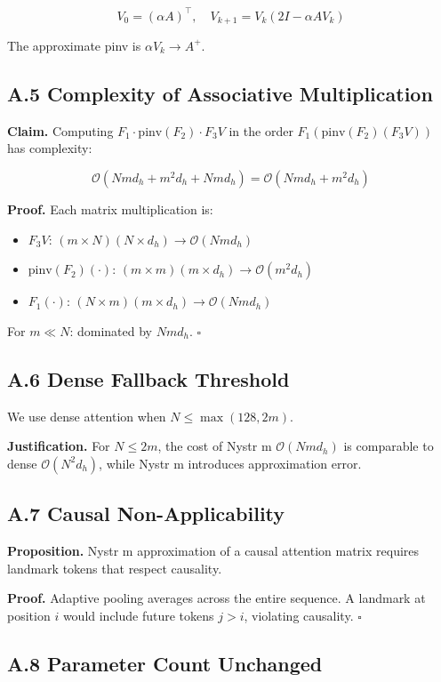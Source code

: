 \[
V_0 = (\alpha A)^\top, \quad V_{k+1} = V_k (2I - \alpha A V_k)
\tag{A.6}
\]

The approximate pinv is $\alpha V_k \to A^+$.

\subsection{A.5 Complexity of Associative Multiplication}

\textbf{Claim.} Computing $F_1 \cdot \text{pinv}(F_2) \cdot F_3 V$ in the order 
$F_1 (\text{pinv}(F_2) (F_3 V))$ has complexity:

\[
\mathcal{O}(N m d_h + m^2 d_h + N m d_h) = \mathcal{O}(N m d_h + m^2 d_h)
\tag{A.7}
\]

\textbf{Proof.} Each matrix multiplication is:
\begin{itemize}
\item $F_3 V$: $(m \times N) (N \times d_h) \to \mathcal{O}(N m d_h)$
\item $\text{pinv}(F_2) (\cdot)$: $(m \times m) (m \times d_h) \to \mathcal{O}(m^2 d_h)$
\item $F_1 (\cdot)$: $(N \times m) (m \times d_h) \to \mathcal{O}(N m d_h)$

\end{itemize}
For $m \ll N$: dominated by $N m d_h$. $\square$

\subsection{A.6 Dense Fallback Threshold}

We use dense attention when $N \leq \max(128, 2m)$.

\textbf{Justification.} For $N \leq 2m$, the cost of Nystr m $\mathcal{O}(N m d_h)$ 
is comparable to dense $\mathcal{O}(N^2 d_h)$, while Nystr m introduces 
approximation error.

\subsection{A.7 Causal Non-Applicability}

\textbf{Proposition.} Nystr m approximation of a causal attention matrix 
requires landmark tokens that respect causality.

\textbf{Proof.} Adaptive pooling averages across the entire sequence. A landmark 
at position $i$ would include future tokens $j > i$, violating causality. $\square$

\subsection{A.8 Parameter Count Unchanged}

